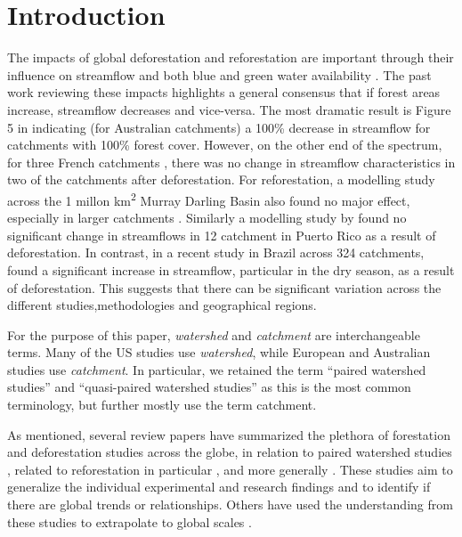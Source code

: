 \documentclass[]{elsarticle} %
\begin{document}
\doublespacing

\hypertarget{introduction}{%
\section{Introduction}\label{introduction}}

The impacts of global deforestation and reforestation are important through their influence on streamflow and both blue and green water availability \citep{hoekvandijke2022, schyns2019}. The past work reviewing these impacts \citep{andreassian2004, jackson2005, zhang2017, brown2005, brown2013, filoso2017} highlights a general consensus that if forest areas increase, streamflow decreases and vice-versa. The most dramatic result is Figure 5 in \citet{zhang2011} indicating (for Australian catchments) a 100\% decrease in streamflow for catchments with 100\% forest cover. However, on the other end of the spectrum, for three French catchments \citep{cosandey2005}, there was no change in streamflow characteristics in two of the catchments after deforestation. For reforestation, a modelling study across the 1 millon km\textsuperscript{2} Murray Darling Basin also found no major effect, especially in larger catchments \citep{vandijk2007}. Similarly a modelling study by \citet{beck2013} found no significant change in streamflows in 12 catchment in Puerto Rico as a result of deforestation. In contrast, in a recent study in Brazil across 324 catchments, \citet{levy2018} found a significant increase in streamflow, particular in the dry season, as a result of deforestation. This suggests that there can be significant variation across the different studies,methodologies and geographical regions.

For the purpose of this paper, \emph{watershed} and \emph{catchment} are interchangeable terms. Many of the US studies use \emph{watershed}, while European and Australian studies use \emph{catchment}. In particular, we retained the term ``paired watershed studies'' and ``quasi-paired watershed studies'' as this is the most common terminology, but further mostly use the term catchment.

As mentioned, several review papers have summarized the plethora of forestation and deforestation studies across the globe, in relation to paired watershed studies \citep{brown2005, hewlett1984}, related to reforestation in particular \citep{filoso2017}, and more generally \citep{jackson2005, zhang2017}. These studies aim to generalize the individual experimental and research findings and to identify if there are global trends or relationships. Others have used the understanding from these studies to extrapolate to global scales \citep{hoekvandijke2022}.
\end{document}
